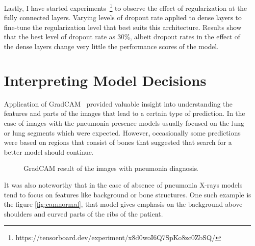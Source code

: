 Lastly, I have started experiments~\footnote{https://tensorboard.dev/experiment/x8d0woI6Q7SpKo8zc0ZbSQ/} to observe the effect of regularization at the fully connected layers.
Varying levels of dropout rate applied to dense layers to fine-tune the regularization level that best suits this architecture. Results show that the best level of dropout rate as 30\%, albeit dropout rates in the effect of the dense layers change very little the performance scores of the model.


\section{Interpreting Model Decisions}
Application of GradCAM~\cite{cam} provided valuable insight into understanding the features and parts of the images that lead to a certain type of prediction.
In the case of images with the pneumonia presence models usually focused on the lung or lung segments which were expected.
However, occasionally some predictions were based on regions that consist of bones that suggested that search for a better model should continue.

\begin{figure}[H]%
    \centering
    \qquad
    \caption{GradCAM result of the images with pneumonia diagnosis.}%
    \label{fig:campnue}%
\end{figure}

It was also noteworthy that in the case of absence of pneumonia X-rays models tend to focus on features like background or bone structures.
One such example is the figure \ref{fig:camnormal}, that model gives emphasis on the background above shoulders and curved parts of the ribs of the patient.

